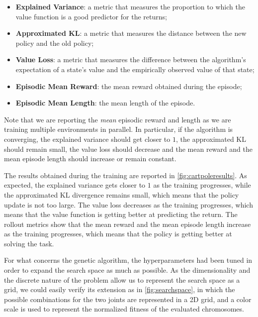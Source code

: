 \begin{itemize}
    \item \textbf{Explained Variance}: a metric that measures the proportion to which the value function is a good predictor for the returns;
    \item \textbf{Approximated KL}: a metric that measures the distance between the new policy and the old policy;
    \item \textbf{Value Loss}: a metric that measures the difference between the algorithm's expectation of a state's value and the empirically observed value of that state;
    \item \textbf{Episodic Mean Reward}: the mean reward obtained during the episode;
    \item \textbf{Episodic Mean Length}: the mean length of the episode.
\end{itemize}

Note that we are reporting the \textit{mean} episodic reward and length as we are training multiple environments in parallel. In particular, if the algorithm is converging, the explained variance should get closer to $1$, the approximated KL should remain small, the value loss should decrease and the mean reward and the mean episode length should increase or remain constant.


The results obtained during the training are reported in \cref{fig:cartpoleresults}. As expected, the explained variance gets closer to $1$ as the training progresses, while the approximated KL divergence remains small, which means that the policy update is not too large. The value loss decreases as the training progresses, which means that the value function is getting better at predicting the return. The rollout metrics show that the mean reward and the mean episode length increase as the training progresses, which means that the policy is getting better at solving the task.

For what concerns the genetic algorithm, the hyperparameters had been tuned in order to expand the search space as much as possible. As the dimensionality and the discrete nature of the problem allow us to represent the search space as a grid, we could easily verify its extension as in \cref{fig:searchspace}, in which the possible combinations for the two joints are represented in a 2D grid, and a color scale is used to represent the normalized fitness of the evaluated chromosomes.

